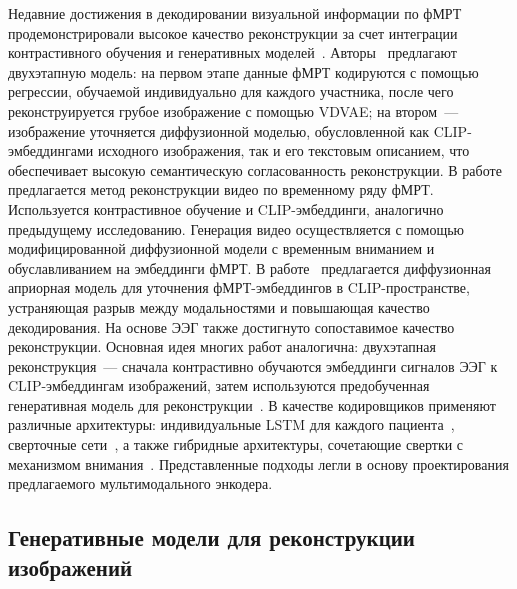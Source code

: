 Недавние достижения в декодировании визуальной информации по фМРТ продемонстрировали высокое качество реконструкции за счет интеграции контрастивного обучения и генеративных моделей~\cite{huang2021fmri}. Авторы~\cite{ozcelik2023naturalscenereconstructionfmri} предлагают двухэтапную модель: на первом этапе данные фМРТ кодируются с помощью регрессии, обучаемой индивидуально для каждого участника, после чего реконструируется грубое изображение с помощью VDVAE; на втором~--- изображение уточняется диффузионной моделью, обусловленной как CLIP-эмбеддингами исходного изображения, так и его текстовым описанием, что обеспечивает высокую семантическую согласованность реконструкции. В работе~\cite{chen2023cinematicmindscapeshighqualityvideo} предлагается метод реконструкции видео по временному ряду фМРТ. Используется контрастивное обучение и CLIP-эмбеддинги, аналогично предыдущему исследованию. Генерация видео осуществляется с помощью модифицированной диффузионной модели с временным вниманием и обуславливанием на эмбеддинги фМРТ. В работе~\cite{scotti2023reconstructingmindseyefmritoimage} предлагается диффузионная априорная модель для уточнения фМРТ-эмбеддингов в CLIP-пространстве, устраняющая разрыв между модальностями и повышающая качество декодирования. На основе ЭЭГ также достигнуто сопоставимое качество реконструкции. Основная идея многих работ аналогична: двухэтапная реконструкция~--- сначала контрастивно обучаются эмбеддинги сигналов ЭЭГ к CLIP-эмбеддингам изображений, затем используются предобученная генеративная модель для реконструкции~\cite{Mishra2022, li2024visual, singh2023eeg2imageimagereconstructioneeg}. В качестве кодировщиков применяют различные архитектуры: индивидуальные LSTM для каждого пациента~\cite{singh2023eeg2imageimagereconstructioneeg}, сверточные сети~\cite{Mishra2022}, а также гибридные архитектуры, сочетающие свертки с механизмом внимания~\cite{li2024visual}. Представленные подходы легли в основу проектирования предлагаемого мультимодального энкодера.

\subsection{Генеративные модели для реконструкции изображений}\label{sec1:generative}

